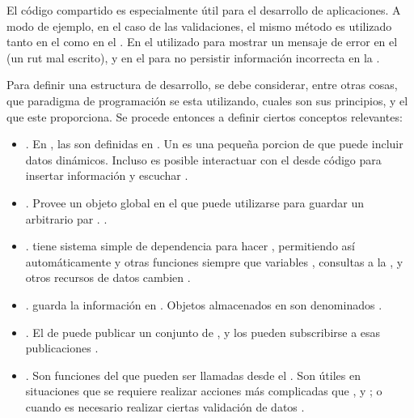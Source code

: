 

El código compartido es especialmente útil para el desarrollo de aplicaciones. A modo de ejemplo, en el caso de las validaciones, el mismo método es utilizado tanto en el \clientSideAS como en el \serverSideAS. En el \clientSideAS utilizado para mostrar un mensaje de error en el \browserINT (un rut mal escrito), y en el \serverSideAS para no persistir información incorrecta en la \dataBaseDB.

Para definir una estructura de desarrollo, se debe considerar, entre otras cosas,  que paradigma de programación se esta utilizando, cuales son sus principios, y el \apiAS que este proporciona. Se procede entonces a definir ciertos conceptos relevantes:

	\begin{itemize}
		\item
			\textbf{\templatesMETEOR}. En \meteorNAME, las \viewsAS son definidas en \templatesMETEOR. Un \templateMETEOR es una pequeña porcion de \htmlNAME que puede incluir datos dinámicos. Incluso es posible interactuar con el \templateMETEOR desde código \javaScriptNAME para insertar información y escuchar \events \cite{online_meteor_documentation}.
		\item
			\textbf{\sessionMETEOR}. Provee un objeto global en el \clientAS que puede utilizarse para guardar un arbitrario par \keyValueDB. \cite{online_meteor_documentation}.
		\item
			\textbf{\trackerMETEOR}. \meteorNAME tiene sistema simple de dependencia para hacer \trackingMETEOR, permitiendo así automáticamente \rerunCPT \templatesMETEOR y otras funciones siempre que variables \sessionMETEOR, consultas a la \dataBaseDB, y otros recursos de datos cambien \cite{online_meteor_documentation}.
		\item
			\textbf{\collectionsMETEOR}. \meteorNAME guarda la información en \collectionsMETEOR. Objetos \javaScriptNAME almacenados en \collectionsMETEOR son denominados \documentsDB \cite{online_meteor_documentation}.

		\item
			\textbf{\publishsubscribeMETEOR}. El \serverAS de \meteorNAME puede publicar un conjunto de \documentsDB , y los \clientsAS pueden subscribirse a esas publicaciones \cite{online_meteor_documentation}.
		\item
			\textbf{\methodsMETEOR}\label{cap:arquitectura:section:generic_architecture_structure:itemize:methods_meteor}. Son funciones del \serverSideAS que pueden ser llamadas desde el \clientSideAS. Son útiles en situaciones que se requiere realizar acciones más complicadas que \insertDB, \updateDB y \removeDB; o cuando es necesario realizar ciertas validación de datos \cite{online_meteor_documentation}.
	\end{itemize}

